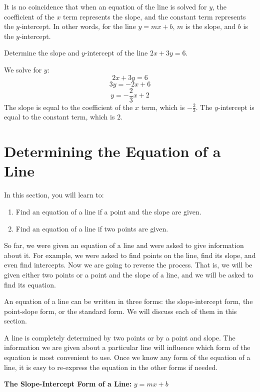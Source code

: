 It is no coincidence that when an equation of the line is solved for $y$, the coefficient of the $x$ term represents the slope, and the constant term represents the $y$-intercept.
In other words, for the line $y = mx + b$, $m$ is the slope, and $b$ is the $y$-intercept.

\begin{example}
Determine the slope and $y$-intercept of the line $2x + 3y = 6$.
\end{example}

\begin{solution}
We solve for $y$:
\[2x + 3y = 6\]
\[3y = -2x + 6\]
\[y = -\frac{2}{3}x + 2\]
The slope is equal to the coefficient of the $x$ term, which is $-\frac{2}{3}$.
The $y$-intercept is equal to the constant term, which is $2$.
\end{solution}



\section{Determining the Equation of a Line}

In this section, you will learn to:
\begin{enumerate}
    \item Find an equation of a line if a point and the slope are given.
    \item Find an equation of a line if two points are given.
\end{enumerate}

So far, we were given an equation of a line and were asked to give information about it. For example, we were asked to find points on the line, find its slope, and even find intercepts. Now we are going to reverse the process. That is, we will be given either two points or a point and the slope of a line, and we will be asked to find its equation.

An equation of a line can be written in three forms: the slope-intercept form, the point-slope form, or the standard form. We will discuss each of them in this section.

A line is completely determined by two points or by a point and slope. The information we are given about a particular line will influence which form of the equation is most convenient to use. Once we know any form of the equation of a line, it is easy to re-express the equation in the other forms if needed.

\textbf{The Slope-Intercept Form of a Line:} $y = mx + b$

